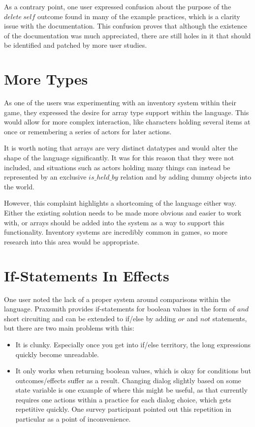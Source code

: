 As a contrary point, one user expressed confusion about the purpose of the
$delete\ self$ outcome found in many of the example practices, which is a clarity
issue with the documentation. This confusion proves that although the existence of the
documentation was much appreciated, there are still holes in it that should be
identified and patched by more user studies.

\section{More Types} \label{sec:MoreTypes}

As one of the users was experimenting with an inventory system within their game,
they expressed the desire for array type support within the language. This would allow
for more complex interaction, like characters holding several items at once or
remembering a series of actors for later actions.

It is worth noting that arrays are very distinct datatypes and would alter the shape
of the language significantly. It was for this reason that they were not included, and
situations such as actors holding many things can instead be represented by an
exclusive $is\_held\_by$ relation and by adding dummy objects into the world.

However, this complaint highlights a shortcoming of the language either way. Either
the existing solution needs to be made more obvious and easier to work with, or
arrays should be added into the system as a way to support this functionality.
Inventory systems are incredibly common in games, so more research into this area
would be appropriate.

\section{If-Statements In Effects} \label{sec:IfStatementsInEffects}

One user noted the lack of a proper system around comparisons within the language.
Praxsmith provides if-statements for boolean values in the form of $and$ short
circuiting and can be extended to if\slash else by adding $or$ and $not$ statements, but
there are two main problems with this:

\begin{itemize}
    \item It is clunky. Especially once you get into if\slash else territory, the long
    expressions quickly become unreadable.
    \item It only works when returning boolean values, which is okay for conditions
    but outcomes\slash effects suffer as a result. Changing dialog slightly based on some
    state variable is one example of where this might be useful, as that currently
    requires one actions within a practice for each dialog choice, which gets
    repetitive quickly. One survey participant pointed out this repetition in particular
    as a point of inconvenience.
\end{itemize}

